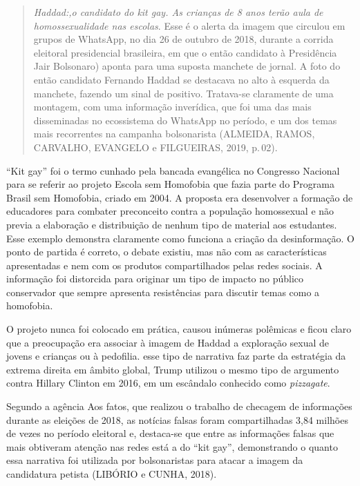 \begin{quote}
\textit{Haddad:,o candidato do \emph{kit gay}. As crianças de 8 anos terão aula de
homossexualidade nas escolas}. Esse é o alerta da imagem que circulou
em grupos de WhatsApp, no dia 26 de outubro de 2018, durante a corrida
eleitoral presidencial brasileira, em que o então candidato à
Presidência Jair Bolsonaro) aponta para uma suposta manchete de
jornal. A foto do então candidato Fernando Haddad se destacava no
alto à esquerda da manchete, fazendo um sinal de positivo. Tratava-se
claramente de uma montagem, com uma informação inverídica, que foi uma
das mais disseminadas no ecossistema do WhatsApp no período, e um dos
temas mais recorrentes na campanha bolsonarista (ALMEIDA, RAMOS,
CARVALHO, EVANGELO e FILGUEIRAS, 2019, p.\,02).
\end{quote}

``Kit gay'' foi o termo cunhado pela bancada evangélica no Congresso
Nacional para se referir ao projeto Escola sem Homofobia que fazia
parte do Programa Brasil sem Homofobia, criado em 2004. A proposta era
desenvolver a formação de educadores para combater preconceito contra a
população homossexual e não previa a elaboração e distribuição de nenhum
tipo de material aos estudantes. Esse exemplo demonstra claramente como
funciona a criação da desinformação. O ponto de partida é correto, o
debate existiu, mas não com as características apresentadas e nem com os
produtos compartilhados pelas redes sociais. A informação foi distorcida
para originar um tipo de impacto no público conservador que sempre
apresenta resistências para discutir temas como a homofobia.

O projeto nunca foi colocado em prática, causou inúmeras polêmicas e
ficou claro que a preocupação era associar à imagem de Haddad a
exploração sexual de jovens e crianças ou à pedofilia. esse tipo de
narrativa faz parte da estratégia da extrema direita em âmbito global,
Trump utilizou o mesmo tipo de argumento contra Hillary Clinton em 2016,
em um escândalo conhecido como \textit{pizzagate}.

Segundo a agência Aos fatos, que realizou o trabalho de checagem de
informações durante as eleições de 2018, as notícias falsas foram
compartilhadas 3,84 milhões de vezes no período eleitoral e, destaca-se
que entre as informações falsas que mais obtiveram atenção nas redes
está a do ``kit gay'', demonstrando o quanto essa narrativa foi
utilizada por bolsonaristas para atacar a imagem da candidatura petista
(LIBÓRIO e CUNHA, 2018).

